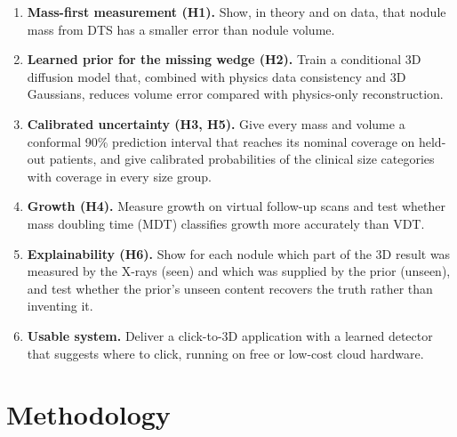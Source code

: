 \begin{enumerate}[label=\textbf{O\arabic*}]
  \item \textbf{Mass-first measurement (H1).} Show, in theory and on data, that nodule mass from DTS has a smaller error than nodule volume.
  \item \textbf{Learned prior for the missing wedge (H2).} Train a conditional 3D diffusion model that, combined with physics data consistency and 3D Gaussians, reduces volume error compared with physics-only reconstruction.
  \item \textbf{Calibrated uncertainty (H3, H5).} Give every mass and volume a conformal 90\% prediction interval that reaches its nominal coverage on held-out patients, and give calibrated probabilities of the clinical size categories with coverage in every size group.
  \item \textbf{Growth (H4).} Measure growth on virtual follow-up scans and test whether mass doubling time (MDT) classifies growth more accurately than VDT.
  \item \textbf{Explainability (H6).} Show for each nodule which part of the 3D result was measured by the X-rays (seen) and which was supplied by the prior (unseen), and test whether the prior's unseen content recovers the truth rather than inventing it.
  \item \textbf{Usable system.} Deliver a click-to-3D application with a learned detector that suggests where to click, running on free or low-cost cloud hardware.
\end{enumerate}

\section{Methodology}

